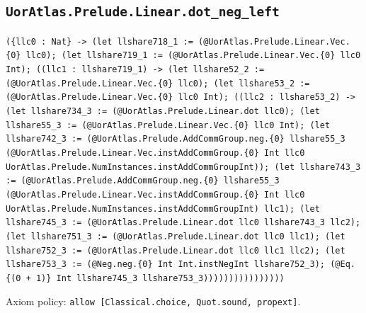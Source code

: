 \documentclass[11pt]{article}
\begin{document}
\subsection*{\texttt{UorAtlas.Prelude.Linear.dot\_neg\_left}}
\noindent\texttt{(\{llc0 : Nat\} -> (let llshare718\_1 := (@UorAtlas.Prelude.Linear.Vec.\{0\} llc0); (let llshare719\_1 := (@UorAtlas.Prelude.Linear.Vec.\{0\} llc0 Int); ((llc1 : llshare719\_1) -> (let llshare52\_2 := (@UorAtlas.Prelude.Linear.Vec.\{0\} llc0); (let llshare53\_2 := (@UorAtlas.Prelude.Linear.Vec.\{0\} llc0 Int); ((llc2 : llshare53\_2) -> (let llshare734\_3 := (@UorAtlas.Prelude.Linear.dot llc0); (let llshare55\_3 := (@UorAtlas.Prelude.Linear.Vec.\{0\} llc0 Int); (let llshare742\_3 := (@UorAtlas.Prelude.AddCommGroup.neg.\{0\} llshare55\_3 (@UorAtlas.Prelude.Linear.Vec.instAddCommGroup.\{0\} Int llc0 UorAtlas.Prelude.NumInstances.instAddCommGroupInt)); (let llshare743\_3 := (@UorAtlas.Prelude.AddCommGroup.neg.\{0\} llshare55\_3 (@UorAtlas.Prelude.Linear.Vec.instAddCommGroup.\{0\} Int llc0 UorAtlas.Prelude.NumInstances.instAddCommGroupInt) llc1); (let llshare745\_3 := (@UorAtlas.Prelude.Linear.dot llc0 llshare743\_3 llc2); (let llshare751\_3 := (@UorAtlas.Prelude.Linear.dot llc0 llc1); (let llshare752\_3 := (@UorAtlas.Prelude.Linear.dot llc0 llc1 llc2); (let llshare753\_3 := (@Neg.neg.\{0\} Int Int.instNegInt llshare752\_3); (@Eq.\{(0 + 1)\} Int llshare745\_3 llshare753\_3))))))))))))))))}\par
\noindent Axiom policy: \texttt{allow [Classical.choice, Quot.sound, propext]}.\par
\end{document}
